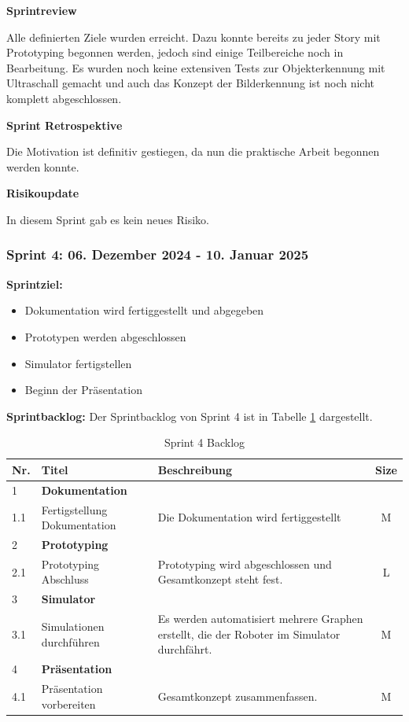 \textbf{Sprintreview}

Alle definierten Ziele wurden erreicht. Dazu konnte bereits zu jeder Story mit Prototyping begonnen werden, jedoch sind einige Teilbereiche noch in Bearbeitung. Es wurden noch keine extensiven Tests zur Objekterkennung mit Ultraschall gemacht und auch das Konzept der Bilderkennung ist noch nicht komplett abgeschlossen.

\textbf{Sprint Retrospektive}

Die Motivation ist definitiv gestiegen, da nun die praktische Arbeit begonnen werden konnte.

\textbf{Risikoupdate}

In diesem Sprint gab es kein neues Risiko.

\newpage
\subsubsection{Sprint 4: 06. Dezember 2024 - 10. Januar 2025}

\textbf{Sprintziel:}
\begin{itemize}
    \item Dokumentation wird fertiggestellt und abgegeben
    \item Prototypen werden abgeschlossen
    \item Simulator fertigstellen
    \item Beginn der Präsentation
\end{itemize}

\textbf{Sprintbacklog:} Der Sprintbacklog von Sprint 4 ist in Tabelle \ref{table:sprint4-backlog} dargestellt.

\begin{table}[H]
\centering
\small
\begin{tabularx}{\textwidth}{|l|l|X|c|}
\hline
  \textbf{Nr.} & \textbf{Titel} & \textbf{Beschreibung} & \textbf{Size}\\
  \hline
  1  & \textbf{Dokumentation} &&\\
  \hline
  1.1  & Fertigstellung Dokumentation & Die Dokumentation wird fertiggestellt & M\\
  \hline
  2 & \textbf{Prototyping} && \\
  \hline
  2.1 & Prototyping Abschluss & Prototyping wird abgeschlossen und Gesamtkonzept steht fest. & L \\
  \hline
  3 & \textbf{Simulator} && \\
  \hline
  3.1 & Simulationen durchführen & Es werden automatisiert mehrere Graphen erstellt, die der Roboter im Simulator durchfährt. & M\\
  \hline
  4 & \textbf{Präsentation} && \\
  \hline
  4.1 & Präsentation vorbereiten & Gesamtkonzept zusammenfassen. & M \\
  \hline
\end{tabularx}
\caption{Sprint 4 Backlog}
\label{table:sprint4-backlog}
\end{table}

